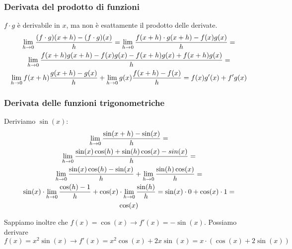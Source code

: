 \documentclass[12pt,a4paper]{article}
\begin{document}
\subsubsection{Derivata del prodotto di funzioni}
$f \cdot g$ \`e derivabile in $x$, ma non \`e esattamente il prodotto delle
derivate.
\begin{multline}
\lim \limits_{h \to 0} {(f \cdot g) (x + h) - (f \cdot g) (x) \over h} = 
\lim \limits_{h \to 0} {f(x+h) \cdot g(x+h) - f(x)g(x) \over h} = \\
\lim \limits_{h \to 0} {f(x+h) g(x+h) - f(x) g(x) 
- f(x+h)g(x) + f(x+h)g(x) \over h} = \\
\lim \limits_{h \to 0} f(x+h) {g(x+h) - g(x) \over h} + 
\lim \limits_{h \to 0} g(x) {f(x+h) - f(x) \over h} =
f(x) g'(x) + f' g(x)
\end{multline}

\subsubsection{Derivata delle funzioni trigonometriche}
Deriviamo $\sin(x)$:
\begin{multline}
\lim_{h \to 0} {\sin(x+h) - \sin(x) \over h} = \\
\lim_{h \to 0} {\sin(x)\cos(h) + \sin(h)\cos(x) - sin(x) \over h} = \\
\lim_{h \to 0} {\sin(x)\cos(h) - \sin(x) \over h} +
\lim_{h \to 0} {\sin(h)\cos(x) \over h} = \\
\sin(x) \cdot \lim_{h \to 0} {\cos(h) - 1 \over h} +
\cos(x) \cdot \lim_{h \to 0} {\sin(h) \over h} = \sin(x) \cdot 0 + 
\cos(x) \cdot 1 = \\ \cos(x)
\end{multline}

Sappiamo inoltre che $f(x) = \cos(x) \to f'(x) = - \sin(x) $.
Possiamo derivare $f(x) = x^2 \sin(x) \to f' (x) = 
x^2 \cos(x) + 2x \sin(x) = x \cdot (\cos(x) + 2 \sin(x)) $
\end{document}
